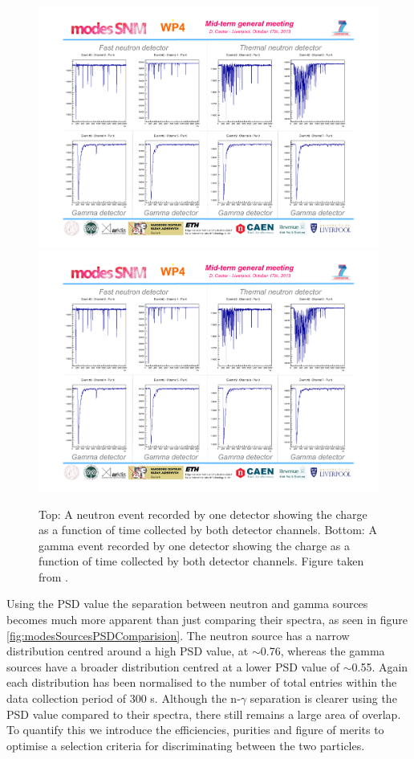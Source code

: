 \begin{figure}[htbp]
\begin{center}
\includegraphics[width=140mm]{Chapter8/figures/fastNeutronEventSignal.pdf} \\
\includegraphics[width=140mm]{Chapter8/figures/gammaEventSignal.pdf} 
\caption{Top: A neutron event recorded by one detector showing the charge as a function of time collected by both detector channels. Bottom: A gamma event recorded by one detector showing the charge as a function of time collected by both detector channels. Figure taken from \cite{modesInternal}.}
\label{fig:modesNeutronGammaEventSignals}
\end{center}
\end{figure}

Using the PSD value the separation between neutron and gamma sources becomes much more apparent than just comparing their spectra, as seen in figure \ref{fig:modesSourcesPSDComparision}. The neutron source has a narrow distribution centred around a high PSD value, at $\sim$0.76, whereas the gamma sources have a broader distribution centred at a lower PSD value of $\sim$0.55. Again each distribution has been normalised to the number of total entries within the data collection period of 300 s. Although the n-$\gamma$ separation is clearer using the PSD value compared to their spectra, there still remains a large area of overlap. To quantify this we introduce the efficiencies, purities and figure of merits to optimise a selection criteria for discriminating between the two particles.


